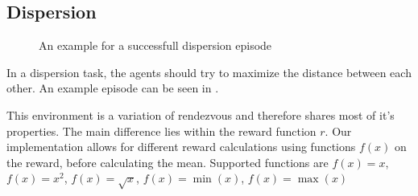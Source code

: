 \subsection{Dispersion}
\begin{figure}[htp]
    \centering
    \hspace{1cm}                       
    \caption{An example for a successfull dispersion episode}
    \label{fig:dispersion_example}
\end{figure}

In a dispersion task, the agents should try to maximize the distance between each other. An example episode can be seen in .\par

This environment is a variation of rendezvous and therefore shares most of it's properties. The main difference lies within the reward function $r$. Our implementation allows for different reward calculations using functions $f(x)$ on the reward, before calculating the mean. Supported functions are $f(x) = x$, $f(x) = x^2$, $f(x) = \sqrt{x}$, $f(x) = \min(x)$, $f(x) = \max(x)$

